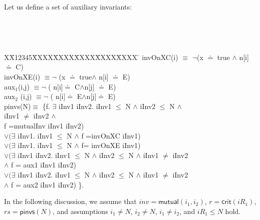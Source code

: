 \documentclass[final]{IEEEtran}
\newlength{\fminilength}
\newenvironment{fmini}[1][\linewidth]
  {\setlength{\fminilength}{#1\fboxsep-2\fboxrule}%
   \vspace{2ex}\noindent\begin{lrbox}{\fminibox}\begin{minipage}{\fminilength}%
   \mbox{ }\hfill\vspace{-2.5ex}}%
  {\end{minipage}\end{lrbox}\vspace{1ex}\hspace{0ex}%
   \framebox{\usebox{\fminibox}}}
\newenvironment{specification}
{\noindent\scriptsize
\tt\begin{fmini}\begin{tabbing}X\=X12345\=XXXX\=XXXX\=XXXX\=XXXX\=XXXX
\=\+\kill} {\end{tabbing}\normalfont\end{fmini}}
\def \eqc {=}
\def \andc {\wedge }
\def \negc {\lnot}
\def \iInv {iInv}
\begin{document}
\begin{example}\label{example2}
Let us define a set of auxiliary invariants:

\begin{specification}
invOnXC(i)  $\equiv$ $\negc$(x $\doteq$ true $\andc$ n[i]$\doteq$ C)   \\

invOnXE(i)   $\equiv \negc$ (x $\doteq$ true$\andc$ n[i] $\doteq$ E)  \\


aux$_1$(i,j)   $\equiv \negc$ ( n[i]$\doteq$ C$\andc$n[j] $\doteq$ E)  \\

aux$_2$ (i,j) $\equiv \negc$  ( n[i]$\doteq$ E$\andc$n[j]$\doteq$ E)\\

  pinvs(N)$\equiv$ \{f. $\exists$ \iInv1 \iInv2. \iInv1 $\le$ N $\wedge$ \iInv2 $\le$ N $\wedge$\\
   \iInv1 $\ne$ \iInv2 $\wedge$   \\
   f =mutualInv   \iInv1 \iInv2) \\
 $ \vee(\exists$ \iInv1. \iInv1 $\le$ N $\wedge$  f =invOnXC  \iInv1)   \\
$\vee(\exists$ \iInv1. \iInv1 $\le$ N $\wedge$  f= invOnXE \iInv1)    \\
$\vee(\exists$ \iInv1 \iInv2. \iInv1 $\le$ N $\wedge$ \iInv2 $\le$ N $\wedge$ \iInv1 $\ne$ \iInv2 \\
$\wedge$ f =  aux1  \iInv1 \iInv2) \\
$\vee(\exists$ \iInv1 \iInv2. \iInv1 $\le$ N $\wedge$ \iInv2 $\le$ N $\wedge$ \iInv1 $\ne$ \iInv2 \\
$\wedge$ f =  aux2  \iInv1 \iInv2) \}.

\end{specification}

In the following discussion, we assume that $inv=\mathsf{mutual} (i_1,i_2)$, $r=\mathsf{crit}(iR_1)$, $rs= \mathsf{pinvs} (N)$, and  assumptions  $i_1 \neq N$, $i_2 \neq N$, $i_1 \neq i_2$, and $iR_1 \leq N$ hold.

\begin{itemize}



\end{itemize}
\end{example}
\end{document}
